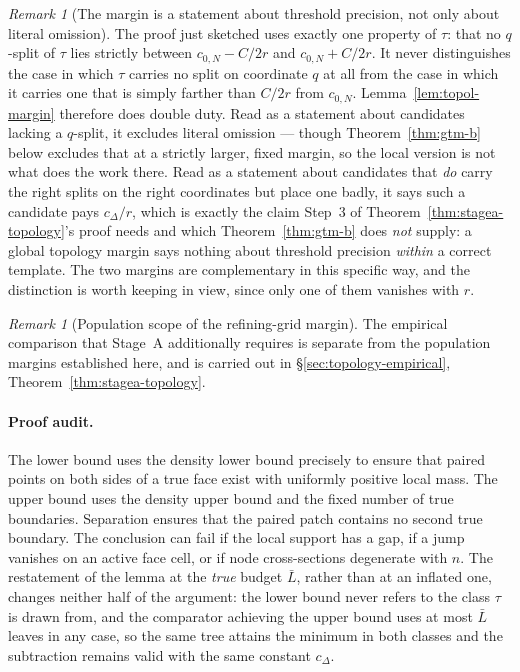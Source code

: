 \documentclass[11pt]{article}
\theoremstyle{plain}
\theoremstyle{definition}
\theoremstyle{remark}
\newtheorem{remark}[theorem]{Remark}
\begin{document}
\begin{remark}[The margin is a statement about threshold precision, not only
about literal omission]\label{rem:omission-is-localisation}
The proof just sketched uses exactly one property of \(\tau\): that no
\(q\)-split of \(\tau\) lies strictly between \(c_{0,N}-C/2r\) and
\(c_{0,N}+C/2r\). It never distinguishes the case in which \(\tau\) carries no
split on coordinate \(q\) at all from the case in which it carries one that is
simply farther than \(C/2r\) from \(c_{0,N}\). Lemma~\ref{lem:topol-margin}
therefore does double duty. Read as a statement about candidates lacking a
\(q\)-split, it excludes literal omission --- though
Theorem~\ref{thm:gtm-b} below excludes that at a strictly larger, fixed
margin, so the local version is not what does the work there. Read as a
statement about candidates that \emph{do} carry the right splits on the right
coordinates but place one badly, it says such a candidate pays \(c_\Delta/r\),
which is exactly the claim Step~3 of Theorem~\ref{thm:stagea-topology}'s proof
needs and which Theorem~\ref{thm:gtm-b} does \emph{not} supply: a global
topology margin says nothing about threshold precision \emph{within} a correct
template. The two margins are complementary in this specific way, and the
distinction is worth keeping in view, since only one of them vanishes with
\(r\).
\end{remark}

\begin{remark}[Population scope of the refining-grid margin]
The empirical comparison that Stage~A additionally requires is separate
from the population margins established here, and is carried out in
\S\ref{sec:topology-empirical}, Theorem~\ref{thm:stagea-topology}.
\end{remark}

\paragraph{Proof audit.}
The lower bound uses the density lower bound precisely to ensure that paired
points on both sides of a true face exist with uniformly positive local
mass.  The upper bound uses the density upper bound and the fixed number of
true boundaries.  Separation ensures that the paired patch contains no
second true boundary.  The conclusion can fail if the local support has a
gap, if a jump vanishes on an active face cell, or if node cross-sections
degenerate with \(n\). The restatement of the lemma at the \emph{true} budget
\(\bar L\), rather than at an inflated one, changes neither half of the
argument: the lower bound never refers to the class \(\tau\) is drawn from,
and the comparator achieving the upper bound uses at most \(\bar L\) leaves
in any case, so the same tree attains the minimum in both classes and the
subtraction remains valid with the same constant \(c_\Delta\).
\end{document}
